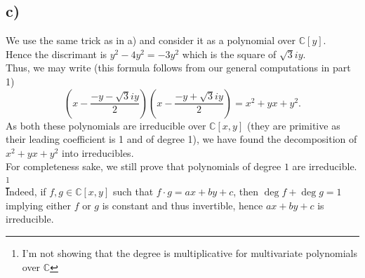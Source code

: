 \documentclass[11pt, a4paper]{article}
\begin{document}
\subsection*{c)}
We use the same trick as in a) and consider it as a polynomial over $ \mathbb{C}[y]$.\\
Hence the discrimant is $ y^{2}-4y^{2}= -3y^{2}$ which is the square of $ \sqrt{3} i y$.\\
Thus, we may write (this formula follows from our general computations in part 1) 
\[ 
	\left(x - \frac{- y - \sqrt{3} i y}{2}\right) \left( x- \frac{-y + \sqrt{3} i y}{2}\right) = x^{2} + yx + y^{2}.
\]
As both these polynomials are irreducible over $ \mathbb{C}[x,y]$  (they are primitive as their leading coefficient is 1 and of degree 1), we have found the decomposition of $x^{2}+yx + y^{2}$ into irreducibles.\\

For completeness sake, we still prove that polynomials of degree $1$ are irreducible. \footnote{I'm not showing that the degree is multiplicative for multivariate polynomials over $\mathbb{C}$ }\\
Indeed, if $ f,g \in \mathbb{C}[x,y]$ such that $ f\cdot g = ax +by +c$, then $ \deg f + \deg g = 1$ implying either $ f$ or $ g$ is constant and thus invertible, hence $ ax+by + c$ is irreducible.










				
\end{document}

